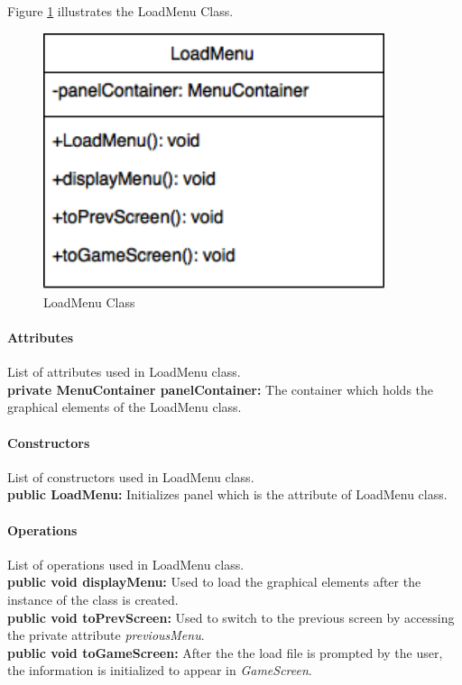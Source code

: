 \documentclass[12pt]{article} %
\begin{document}
Figure \ref{fig:loadmenu} illustrates the LoadMenu Class.
\begin{figure}[h!]
   \centering
   \vspace{10pt}%
   \includegraphics[width=10cm]{loadmenu.png}
   \caption{LoadMenu Class}
   \label{fig:loadmenu}
\end{figure}

\paragraph{Attributes \\}

List of attributes used in LoadMenu class.\\
\textbf{private MenuContainer panelContainer:} The container which holds the graphical elements of the LoadMenu class. 


\paragraph{Constructors \\}
List of constructors used in LoadMenu class.\\
\textbf{public LoadMenu:} Initializes panel which is the attribute of LoadMenu class.


\paragraph{Operations \\}
List of operations used in LoadMenu class.\\
\textbf{public void displayMenu:} Used to load the graphical elements after the instance of the class is created.\\
\textbf{public void toPrevScreen:} Used to switch to the previous screen by accessing the private attribute \textit{previousMenu}.\\
\textbf{public void toGameScreen:} After the the load file is prompted by the user, the information is initialized to appear in \textit{GameScreen}.
\end{document}
